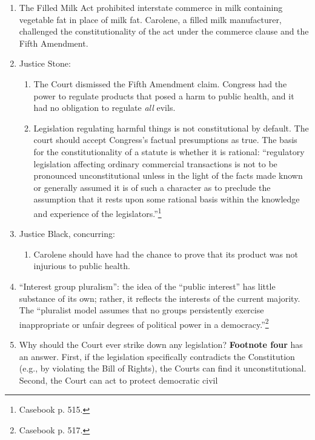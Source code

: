 \begin{enumerate}
    \item The Filled Milk Act prohibited interstate commerce in milk 
    containing vegetable fat in place of milk fat. Carolene, a filled milk 
    manufacturer, challenged the constitutionality of the act under the 
    commerce clause and the Fifth Amendment.
    \item Justice Stone:
    \begin{enumerate}
        \item The Court dismissed the Fifth Amendment claim. Congress had the 
        power to regulate products that posed a harm to public health, and it 
        had no obligation to regulate \emph{all} evils.
        \item Legislation regulating harmful things is not constitutional by 
        default. The court should accept Congress's factual presumptions 
        as true. The basis for the constitutionality of a statute is whether 
        it is rational: ``regulatory legislation affecting ordinary commercial 
        transactions is not to be pronounced unconstitutional unless in the 
        light of the facts made known or generally assumed it is of such a 
        character as to preclude the assumption that it rests upon some 
        rational basis within the knowledge and experience of the 
        legislators.''\footnote{Casebook p. 515.}
    \end{enumerate}
    \item Justice Black, concurring:
    \begin{enumerate}
        \item Carolene should have had the chance to prove that its product 
        was not injurious to public health. 
    \end{enumerate}
    \item ``Interest group pluralism'': the idea of the ``public interest'' 
    has little substance of its own; rather, it reflects the interests of the 
    current majority. The ``pluralist model assumes that no groups 
    persistently exercise inappropriate or unfair degrees of political power 
    in a democracy.''\footnote{Casebook p. 517.}
    \item Why should the Court ever strike down any legislation? \textbf{Footnote four} 
    has an answer. First, if the legislation specifically contradicts the 
    Constitution (e.g., by violating the Bill of Rights), the Courts can find 
    it unconstitutional. Second, the Court can act to protect democratic civil 

\end{enumerate}
